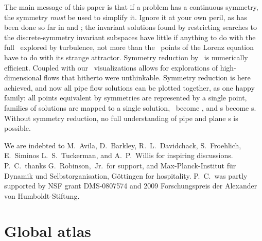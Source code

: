 \documentclass{jfm}
\begin{document}
The main message of this paper is that if a problem has a continuous
symmetry, the symmetry \emph{must} be used to simplify it. Ignore it at
your own peril, as has been done so far in \KS{}
and \pCf{}; the invariant solutions found by restricting
searches to the discrete-symmetry invariant subspaces have little if
anything to do with the full \statesp\ explored by turbulence, not more
than the \eqv\ points of the Lorenz equation have to do with its strange
attractor. Symmetry reduction by \mslices\ is numerically efficient.
Coupled with our \statesp\ visualizations allows for explorations of
high-dimensional flows that hitherto were unthinkable. Symmetry reduction
is here achieved, and now all pipe flow solutions can be plotted
together, as one happy family: all points equivalent by symmetries are
represented by a single point, families of solutions are mapped to a
single solution, \reqva\ become \eqva, and \rpo s become \po s. Without
symmetry reduction, no full understanding of pipe and plane \pCf s is
possible.

\begin{acknowledgments}
We are indebted to
M.~Avila,
D.~Barkley,
R.~L.~Davidchack,
S.~Froehlich,
E.~Siminos
L.~S.~Tuckerman,
and
A.~P.~Willis
for inspiring discussions.
P.~C.\ thanks G.~Robinson,~Jr.\ for support, and
Max-Planck-Institut f\"ur Dynamik und Selbstorganisation,
G\"ottingen for hospitality.
P.~C.\ was partly supported by NSF grant DMS-0807574
and
2009 Forschungspreis der Alexander von Humboldt-Stiftung.
\end{acknowledgments}

\appendix

\section{Global atlas}
\label{appe:slice}
\end{document}
